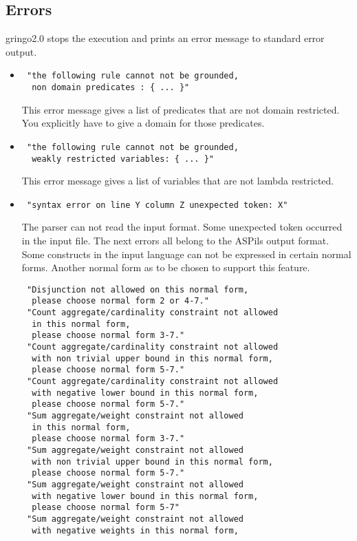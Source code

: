\documentclass[a4paper,10pt]{article}
\begin{document}
\subsection{Errors}
gringo2.0 stops the execution and prints an error message to standard error output.
\begin{itemize}
 \item 
\begin{verbatim}
 "the following rule cannot not be grounded,
  non domain predicates : { ... }"
\end{verbatim}
This error message gives a list of predicates that are not domain restricted.
You explicitly have to give a domain for those predicates.
 \item 
\begin{verbatim}
 "the following rule cannot not be grounded,
  weakly restricted variables: { ... }"
\end{verbatim}
This error message gives a list of variables that are not lambda restricted. 
\item
\begin{verbatim}
 "syntax error on line Y column Z unexpected token: X"
\end{verbatim}
The parser can not read the input format. Some unexpected token occurred in the input file.
\newline
\newline
The next errors all belong to the ASPils output format.
Some constructs in the input language can not be expressed in certain normal forms.
Another normal form as to be chosen to support this feature.
\begin{verbatim}
 "Disjunction not allowed on this normal form,
  please choose normal form 2 or 4-7."
 "Count aggregate/cardinality constraint not allowed
  in this normal form,
  please choose normal form 3-7."
 "Count aggregate/cardinality constraint not allowed 
  with non trivial upper bound in this normal form,
  please choose normal form 5-7."
 "Count aggregate/cardinality constraint not allowed 
  with negative lower bound in this normal form,
  please choose normal form 5-7."
 "Sum aggregate/weight constraint not allowed
  in this normal form,
  please choose normal form 3-7."
 "Sum aggregate/weight constraint not allowed 
  with non trivial upper bound in this normal form,
  please choose normal form 5-7."
 "Sum aggregate/weight constraint not allowed 
  with negative lower bound in this normal form,
  please choose normal form 5-7"
 "Sum aggregate/weight constraint not allowed
  with negative weights in this normal form,

\end{verbatim}
\end{itemize}
\end{document}
